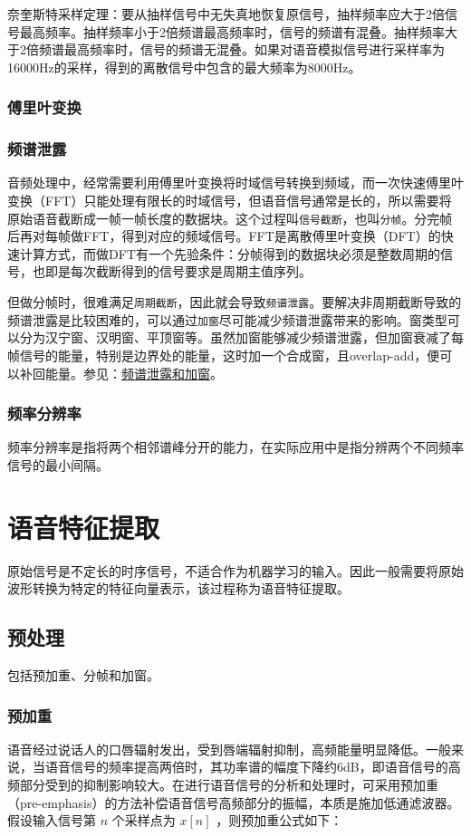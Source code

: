 \documentclass[cn,10pt,math=newtx,citestyle=gb7714-2015,bibstyle=gb7714-2015]{elegantbook}
\begin{document}
奈奎斯特采样定理：要从抽样信号中无失真地恢复原信号，抽样频率应大于2倍信号最高频率。抽样频率小于2倍频谱最高频率时，信号的频谱有混叠。抽样频率大于2倍频谱最高频率时，信号的频谱无混叠。如果对语音模拟信号进行采样率为16000Hz的采样，得到的离散信号中包含的最大频率为8000Hz。

\subsection{傅里叶变换}

\subsection{频谱泄露}

音频处理中，经常需要利用傅里叶变换将时域信号转换到频域，而一次快速傅里叶变换（FFT）只能处理有限长的时域信号，但语音信号通常是长的，所以需要将原始语音截断成一帧一帧长度的数据块。这个过程叫\lstinline{信号截断}，也叫\lstinline{分帧}。分完帧后再对每帧做FFT，得到对应的频域信号。FFT是离散傅里叶变换（DFT）的快速计算方式，而做DFT有一个先验条件：分帧得到的数据块必须是整数周期的信号，也即是每次截断得到的信号要求是周期主值序列。

但做分帧时，很难满足\lstinline{周期截断}，因此就会导致\lstinline{频谱泄露}。要解决非周期截断导致的频谱泄露是比较困难的，可以通过\lstinline{加窗}尽可能减少频谱泄露带来的影响。窗类型可以分为汉宁窗、汉明窗、平顶窗等。虽然加窗能够减少频谱泄露，但加窗衰减了每帧信号的能量，特别是边界处的能量，这时加一个合成窗，且overlap-add，便可以补回能量。参见：\href{https://zhuanlan.zhihu.com/p/339692933}{频谱泄露和加窗}。

\subsection{频率分辨率}
频率分辨率是指将两个相邻谱峰分开的能力，在实际应用中是指分辨两个不同频率信号的最小间隔。


\chapter{语音特征提取}
原始信号是不定长的时序信号，不适合作为机器学习的输入。因此一般需要将原始波形转换为特定的特征向量表示，该过程称为语音特征提取。

\section{预处理}
包括预加重、分帧和加窗。

\subsection{预加重}
语音经过说话人的口唇辐射发出，受到唇端辐射抑制，高频能量明显降低。一般来说，当语音信号的频率提高两倍时，其功率谱的幅度下降约6dB，即语音信号的高频部分受到的抑制影响较大。在进行语音信号的分析和处理时，可采用预加重（pre-emphasis）的方法补偿语音信号高频部分的振幅，本质是施加低通滤波器。假设输入信号第 $n$ 个采样点为 $x[n]$ ，则预加重公式如下：
\end{document}

